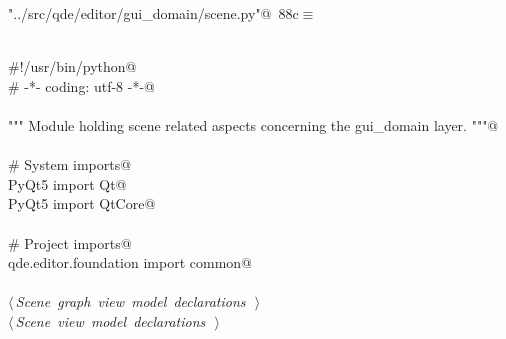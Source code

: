 \documentclass[
    a4paper,      %
    10pt,         %
    openright,    %
    notitlepage,  %
    parskip=half, %
]{scrreprt}       %
\theoremstyle{definition}                    %
\begin{document}
\begin{flushleft} \small
\begin{minipage}{\linewidth}\label{scrap140}\raggedright\small
{} \verb@"../src/qde/editor/gui_domain/scene.py"@\nobreak\ {\footnotesize {88c}}$\equiv$
\vspace{-1ex}
\begin{list}{}{} \item
\mbox{}\lstinline@@\\
\mbox{}\lstinline@#!/usr/bin/python@\\
\mbox{}\lstinline@# -*- coding: utf-8 -*-@\\
\mbox{}\lstinline@@\\
\mbox{}\lstinline@""" Module holding scene related aspects concerning the gui_domain layer. """@\\
\mbox{}\lstinline@@\\
\mbox{}\lstinline@# System imports@\\
\mbox{}\lstinline@from PyQt5 import Qt@\\
\mbox{}\lstinline@from PyQt5 import QtCore@\\
\mbox{}\lstinline@@\\
\mbox{}\lstinline@# Project imports@\\
\mbox{}\lstinline@from qde.editor.foundation import common@\\
\mbox{}\lstinline@@\\
\mbox{}\lstinline@@\hbox{$\langle\,${\itshape Scene graph view model declarations}\nobreak\ {\footnotesize {}}$\,\rangle$}\lstinline@@\\
\mbox{}\lstinline@@\hbox{$\langle\,${\itshape Scene view model declarations}\nobreak\ {\footnotesize {}}$\,\rangle$}\lstinline@@\\
\mbox{}\lstinline@@{\NWsep}
\end{list}
\vspace{-1.5ex}
\footnotesize
\begin{list}{}{\setlength{\itemsep}{-\parsep}\setlength{\itemindent}{-\leftmargin}}

\item{}
\end{list}
\end{minipage}\vspace{4ex}
\end{flushleft}
\end{document}
